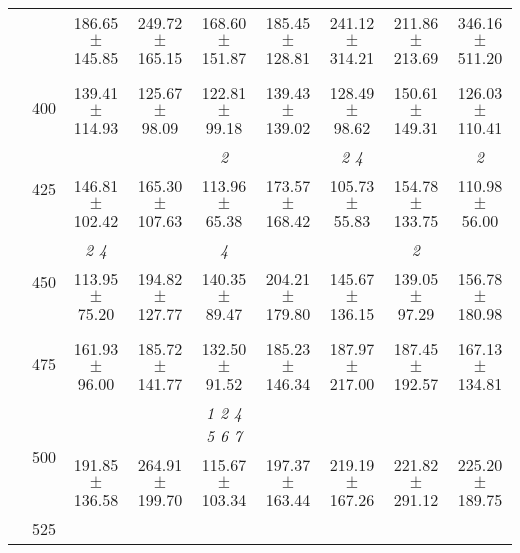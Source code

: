 \begin{table}[h]
{\begin{tabular}{
        ccccccccc}
 & & \cellcolor[HTML]{EFEFEF} 186.65 $\pm$ 145.85& \cellcolor[HTML]{EFEFEF} 249.72 $\pm$ 165.15& \cellcolor[HTML]{EFEFEF} 168.60 $\pm$ 151.87& \cellcolor[HTML]{EFEFEF} 185.45 $\pm$ 128.81& \cellcolor[HTML]{EFEFEF} 241.12 $\pm$ 314.21& \cellcolor[HTML]{EFEFEF} 211.86 $\pm$ 213.69& \cellcolor[HTML]{EFEFEF} 346.16 $\pm$ 511.20 \\ 
 & \multirow{2}{*}{400}& & & & & & &  \\ 
 & & 139.41 $\pm$ 114.93& 125.67 $\pm$ 98.09& 122.81 $\pm$ 99.18& 139.43 $\pm$ 139.02& 128.49 $\pm$ 98.62& 150.61 $\pm$ 149.31& 126.03 $\pm$ 110.41 \\ 
 & \multirow{2}{*}{425}& \cellcolor[HTML]{EFEFEF} & \cellcolor[HTML]{EFEFEF} & \cellcolor[HTML]{EFEFEF} \textit{ 2 }& \cellcolor[HTML]{EFEFEF} & \cellcolor[HTML]{EFEFEF} \textit{ 2 4 }& \cellcolor[HTML]{EFEFEF} & \cellcolor[HTML]{EFEFEF} \textit{ 2 } \\ 
 & & \cellcolor[HTML]{EFEFEF} 146.81 $\pm$ 102.42& \cellcolor[HTML]{EFEFEF} 165.30 $\pm$ 107.63& \cellcolor[HTML]{EFEFEF} 113.96 $\pm$ 65.38& \cellcolor[HTML]{EFEFEF} 173.57 $\pm$ 168.42& \cellcolor[HTML]{EFEFEF} 105.73 $\pm$ 55.83& \cellcolor[HTML]{EFEFEF} 154.78 $\pm$ 133.75& \cellcolor[HTML]{EFEFEF} 110.98 $\pm$ 56.00 \\ 
 & \multirow{2}{*}{450}& \textit{ 2 4 }& & \textit{ 4 }& & & \textit{ 2 }&  \\ 
 & & 113.95 $\pm$ 75.20& 194.82 $\pm$ 127.77& 140.35 $\pm$ 89.47& 204.21 $\pm$ 179.80& 145.67 $\pm$ 136.15& 139.05 $\pm$ 97.29& 156.78 $\pm$ 180.98 \\ 
 & \multirow{2}{*}{475}& \cellcolor[HTML]{EFEFEF} & \cellcolor[HTML]{EFEFEF} & \cellcolor[HTML]{EFEFEF} & \cellcolor[HTML]{EFEFEF} & \cellcolor[HTML]{EFEFEF} & \cellcolor[HTML]{EFEFEF} & \cellcolor[HTML]{EFEFEF}  \\ 
 & & \cellcolor[HTML]{EFEFEF} 161.93 $\pm$ 96.00& \cellcolor[HTML]{EFEFEF} 185.72 $\pm$ 141.77& \cellcolor[HTML]{EFEFEF} 132.50 $\pm$ 91.52& \cellcolor[HTML]{EFEFEF} 185.23 $\pm$ 146.34& \cellcolor[HTML]{EFEFEF} 187.97 $\pm$ 217.00& \cellcolor[HTML]{EFEFEF} 187.45 $\pm$ 192.57& \cellcolor[HTML]{EFEFEF} 167.13 $\pm$ 134.81 \\ 
 & \multirow{2}{*}{500}& & & \textit{ 1 2 4 5 6 7 }& & & &  \\ 
 & & 191.85 $\pm$ 136.58& 264.91 $\pm$ 199.70& 115.67 $\pm$ 103.34& 197.37 $\pm$ 163.44& 219.19 $\pm$ 167.26& 221.82 $\pm$ 291.12& 225.20 $\pm$ 189.75 \\ 
 & \multirow{2}{*}{525}& \cellcolor[HTML]{EFEFEF} & \cellcolor[HTML]{EFEFEF} & \cellcolor[HTML]{EFEFEF} & \cellcolor[HTML]{EFEFEF} & \cellcolor[HTML]{EFEFEF} & \cellcolor[HTML]{EFEFEF} & \cellcolor[HTML]{EFEFEF}  \\ 

\end{tabular}}
\end{table}
